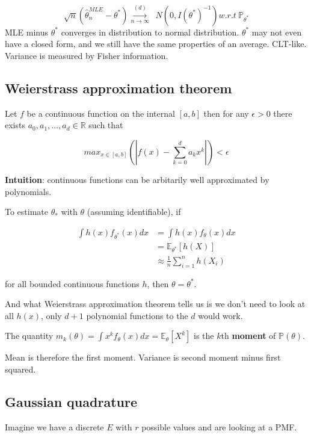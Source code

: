 \documentclass{article}
\begin{document}
$$
\sqrt{n} (\hat{\theta}^{MLE}_{n} - \theta^*) \overset{(d)}{\underset{n \to \infty}{\longrightarrow}} ~ ~ \mathit{N}(0, I(\theta^*)^{-1}) w.r.t ~ \mathbb{P}_{\theta^*}
$$
MLE minus $\theta^*$ converges in distribution to normal distribution. $\theta^*$ may not even have a closed form, and we still have the same properties of an average. CLT-like.
Variance is measured by Fisher information.


\subsection{Weierstrass approximation theorem}

Let $f$ be a continuous function on the internal $[a, b]$ then for any $\epsilon > 0$ there exists $a_0, a_1, \dots, a_d \in \mathbb{R}$ such that

$$
max_{x \in [a, b]}(|f(x) - \sum_{k = 0}^{d}{a_k x^k}|) < \epsilon
$$

\textbf{Intuition}: continuous functions can be arbitarily well approximated by polynomials.

To estimate $\theta_*$ with $\theta$ (assuming identifiable), if

\begin{align*}
\int h(x) f_{\theta^*}(x) dx &= \int h(x) f_{\theta}(x) dx \\
                             &= \mathbb{E}_{\theta^*}[h(X)] \\
                             &\approx \frac{1}{n} \sum_{i=1}^{n} h(X_i)
\end{align*}

for all bounded continuous functions $h$, then $\theta = \theta^*$.

And what Weierstrass approximation theorem tells us is we don't need to look at all $h(x)$, only $d + 1$ polynomial functions to the $d$ would work.

The quantity $m_{k}(\theta) = \int x^k f_{\theta}(x) dx = \mathbb{E}_{\theta}[X^k]$ is the $k$th \textbf{moment} of $\mathbb{P}(\theta)$.

Mean is therefore the first moment. Variance is second moment minus first squared.

\subsection{Gaussian quadrature}

Imagine we have a discrete $E$ with $r$ possible values and are looking at a PMF.
\end{document}
